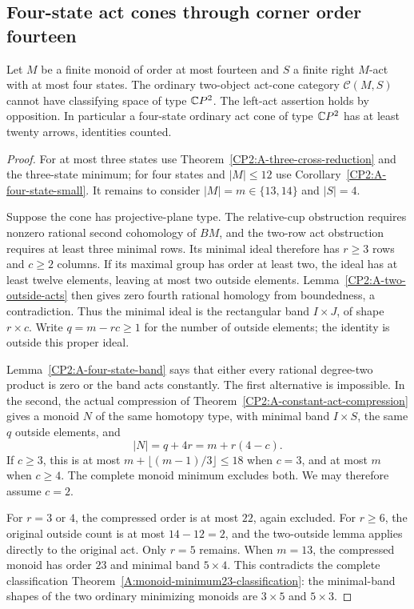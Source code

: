 \subsection{Four-state act cones through corner order fourteen}

\begin{theorem}
\label{CP2:A-four-state-fourteen}
Let $M$ be a finite monoid of order at most fourteen and $S$ a
finite right $M$-act with at most four states. The ordinary
two-object act-cone category $\mathcal C(M,S)$ cannot have
classifying space of type $\mathbb{C}P^2$. The left-act assertion holds
by opposition. In particular a four-state ordinary act cone
of type $\mathbb{C}P^2$ has at least twenty arrows, identities counted.
\end{theorem}
\begin{proof}
For at most three states use Theorem~\ref{CP2:A-three-cross-reduction}
and the three-state minimum; for four states and $|M|\leq12$
use Corollary~\ref{CP2:A-four-state-small}. It remains to consider
$|M|=m\in\{13,14\}$ and $|S|=4$.

Suppose the cone has projective-plane type. The relative-cup
obstruction requires nonzero rational second cohomology of $BM$,
and the two-row act obstruction requires at least three minimal
rows. Its minimal ideal therefore has $r\geq3$ rows and $c\geq2$
columns. If its maximal group has order at least two, the ideal
has at least twelve elements, leaving at most two outside
elements. Lemma~\ref{CP2:A-two-outside-acts} then gives zero
fourth rational homology from boundedness, a contradiction.
Thus the minimal ideal is the rectangular band $I\times J$,
of shape $r\times c$. Write $q=m-rc\geq1$ for the number of
outside elements; the identity is outside this proper ideal.

Lemma~\ref{CP2:A-four-state-band} says that either every rational
degree-two product is zero or the band acts constantly. The
first alternative is impossible. In the second, the actual
compression of Theorem~\ref{CP2:A-constant-act-compression}
gives a monoid $N$ of the same homotopy type, with minimal band
$I\times S$, the same $q$ outside elements, and
\[
 |N|=q+4r=m+r(4-c).
\]
If $c\geq3$, this is at most $m+\lfloor(m-1)/3\rfloor\leq18$
when $c=3$, and at most $m$ when $c\geq4$. The complete monoid
minimum excludes both. We may therefore assume $c=2$.

For $r=3$ or $4$, the compressed order is at most $22$, again
excluded. For $r\geq6$, the original outside count is at most
$14-12=2$, and the two-outside lemma applies directly to the
original act. Only $r=5$ remains. When $m=13$, the compressed
monoid has order $23$ and minimal band $5\times4$. This
contradicts the complete classification
Theorem~\ref{A:monoid-minimum23-classification}: the minimal-band
shapes of the two ordinary minimizing monoids are $3\times5$
and $5\times3$.


\end{proof}
